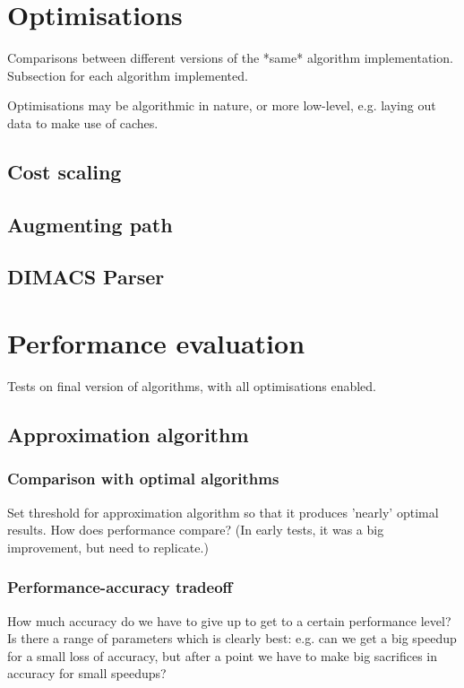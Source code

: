 \section{Optimisations}

Comparisons between different versions of the *same* algorithm implementation. Subsection for each algorithm implemented.

Optimisations may be algorithmic in nature, or more low-level, e.g. laying out data to make use of caches.

\subsection{Cost scaling}

\subsection{Augmenting path}

\subsection{DIMACS Parser}

\section{Performance evaluation}

Tests on final version of algorithms, with all optimisations enabled.

\subsection{Approximation algorithm}

\subsubsection{Comparison with optimal algorithms}

Set threshold for approximation algorithm so that it produces 'nearly' optimal results. How does performance compare? (In early tests, it was a big improvement, but need to replicate.)

\subsubsection{Performance-accuracy tradeoff}

How much accuracy do we have to give up to get to a certain performance level? Is there a range of parameters which is clearly best: e.g. can we get a big speedup for a small loss of accuracy, but after a point we have to make big sacrifices in accuracy for small speedups?


